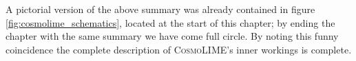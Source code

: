 A pictorial version of the above summary was already contained in figure \ref{fig:cosmolime_schematics}, located at the start of this chapter; by ending the chapter with the same summary we have come full circle. By noting this funny coincidence the complete description of \textsc{CosmoLIME}'s inner workings is complete.